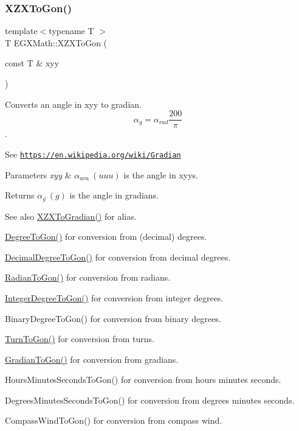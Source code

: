 \subsubsection{\texorpdfstring{X\+Z\+X\+To\+Gon()}{XZXToGon()}}
{\footnotesize\ttfamily template$<$typename T $>$ \\
T E\+G\+X\+Math\+::\+X\+Z\+X\+To\+Gon (\begin{DoxyParamCaption}\item[{const T \&}]{xyy }\end{DoxyParamCaption})}



Converts an angle in xyy to gradian. \[\alpha_{g}=\alpha_{rad}\frac{200}{\pi}\]. 

See \href{https://en.wikipedia.org/wiki/Gradian}{\tt https\+://en.\+wikipedia.\+org/wiki/\+Gradian} 
\begin{DoxyParams}{Parameters}
{\em xyy} & $\alpha_{ava}\ (uuu)$ is the angle in xyys. \\
\hline
\end{DoxyParams}
\begin{DoxyReturn}{Returns}
$\alpha_{g}\ (g)$ is the angle in gradians. 
\end{DoxyReturn}
\begin{DoxySeeAlso}{See also}
\mbox{\hyperlink{group___e_g_x_math-_angle_conversions-_x_z_x_ga91288ab3da9655e8ac1e3db44f9620a4}{X\+Z\+X\+To\+Gradian()}} for alias. 

\mbox{\hyperlink{group___e_g_x_math-_angle_conversions-_degree_ga87c3fab0867021e5d2501197b4db6194}{Degree\+To\+Gon()}} for conversion from (decimal) degrees. 

\mbox{\hyperlink{group___e_g_x_math-_angle_conversions-_decimal_degree_gaeb333a1ad0aeb913c025fbd1be85fcb3}{Decimal\+Degree\+To\+Gon()}} for conversion from decimal degrees. 

\mbox{\hyperlink{group___e_g_x_math-_angle_conversions-_radian_ga36912e5a810b64c271c4dafc17f4ca45}{Radian\+To\+Gon()}} for conversion from radians. 

\mbox{\hyperlink{group___e_g_x_math-_angle_conversions-_integer_degree_ga6e5be425c37ad27319f09329156c64bb}{Integer\+Degree\+To\+Gon()}} for conversion from integer degrees. 

Binary\+Degree\+To\+Gon() for conversion from binary degrees. 

\mbox{\hyperlink{group___e_g_x_math-_angle_conversions-_turn_gad81dd0bb1660ef24e28fa15b2403dec7}{Turn\+To\+Gon()}} for conversion from turns. 

\mbox{\hyperlink{group___e_g_x_math-_angle_conversions-_gradian_gaff399262b6c8455e450e0a9dc8eb2ad1}{Gradian\+To\+Gon()}} for conversion from gradians. 

Hours\+Minutes\+Seconds\+To\+Gon() for conversion from hours minutes seconds. 

Degrees\+Minutes\+Seconds\+To\+Gon() for conversion from degrees minutes seconds. 

Compass\+Wind\+To\+Gon() for conversion from compass wind. 
\end{DoxySeeAlso}
